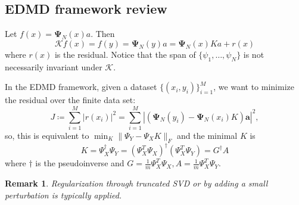 \documentclass{article}[11]
\newtheorem*{remark}{Remark}
\begin{document}
	\subsection*{EDMD framework review}
	Let $f(x) = \mathbf{\Psi}_N(x)a$. Then 
	$$\mathcal{K} f(x) = f(y) = \mathbf{\Psi}_N(y)a = \mathbf{\Psi}_N(x)K a + r(x)$$
	where $r(x)$ is the residual. Notice that the span of $\{ \psi_1, \dots, \psi_N \}$ is not necessarily invariant under $\mathcal{K}$.
	
	In the EDMD framework, given a dataset $\{(x_i,y_i)\}_{i=1}^M$, we want to minimize the residual over the finite data set:
	$$J \coloneqq \sum_{i=1}^M \left| r(x_i) \right|^2 = \sum_{i=1}^M \left| \left(\mathbf{\Psi}_N(y_i) - \mathbf{\Psi}_N(x_i)K\right)\mathbf{a} \right|^2,$$
	so, this is equivalent to $\min_{K} \| \Psi_Y - \Psi_X K\|_F$ and the minimal $K$ is
	$$K = \Psi_X^{\dagger}\Psi_Y = (\Psi_X^T\Psi_X)^{\dagger}(\Psi_X^T\Psi_Y) = G^{\dagger}A$$
	where $\dagger$ is the pseudoinverse and $G=\frac{1}{m}\Psi_X^T\Psi_X, A=\frac{1}{m}\Psi_X^T\Psi_Y$. 
	\begin{remark}
		Regularization through truncated SVD or by adding a small perturbation is typically applied.
	\end{remark}
	
\end{document}
